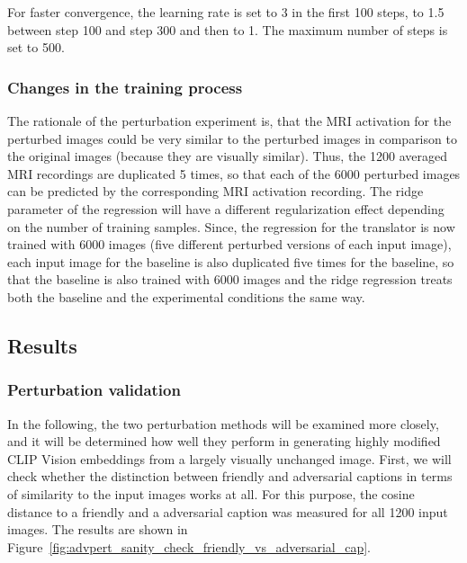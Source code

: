 \noindent{}

For faster convergence, the learning rate is set to 3 in the first 100 steps, to 1.5 between step 100 and step 300 and then to 1. The maximum number of steps is set to 500. 


\subsubsection{Changes in the training  process}

 The rationale of the perturbation experiment is, that the MRI activation for the perturbed images could be very similar to the perturbed images in comparison to the original images (because they are visually similar). Thus, the 1200 averaged MRI recordings are duplicated 5 times, so that each of the 6000 perturbed images can be predicted by the corresponding MRI activation recording. The ridge parameter of the regression will have a different regularization effect depending on the number of training samples. Since, the regression for the translator is now trained with 6000 images (five different perturbed versions of each input image), each input image for the baseline is also duplicated five times for the baseline, so that the baseline is also trained with 6000 images and the ridge regression treats both the baseline and the experimental conditions the same way.

\subsection{Results}

\subsubsection{Perturbation validation}
In the following, the two perturbation methods will be examined more closely, and it will be determined how well they perform in generating highly modified CLIP Vision embeddings from a largely visually unchanged image. First, we will check whether the distinction between friendly and adversarial captions in terms of similarity to the input images works at all. For this purpose, the cosine distance to a friendly and a adversarial caption was measured for all 1200 input images. The results are shown in Figure~\ref{fig:advpert_sanity_check_friendly_vs_adversarial_cap}.

